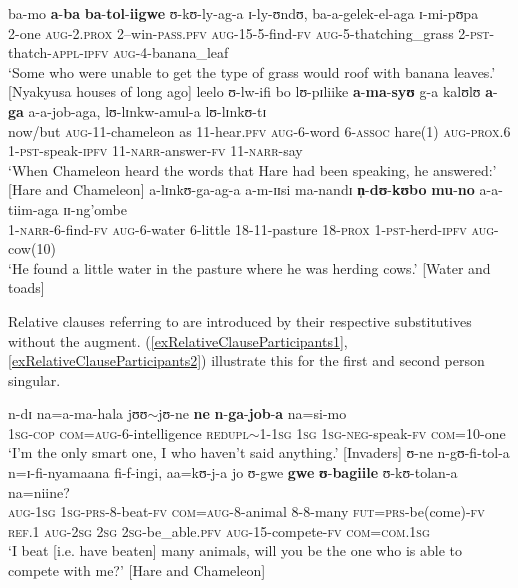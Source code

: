 \begin{exe}
	\ex \label{exSubjectRelativeClause} \gll ba-mo \textbf{a}-\textbf{ba} \textbf{ba}-\textbf{tol}-\textbf{iigwe} ʊ-kʊ-ly-ag-a ɪ-ly-ʊndʊ, ba-a-gelek-el-aga ɪ-mi-pʊpa \\
	2-one \textsc{aug}-2.\textsc{prox} 2--win-\textsc{pass.pfv} \textsc{aug}-15-5-find-\textsc{fv} \textsc{aug}-5-thatching\_grass 2-\textsc{pst}-thatch-\textsc{appl}-\textsc{ipfv} \textsc{aug}-4-banana\_leaf \\
	\glt `Some who were unable to get the type of grass would roof with banana leaves.' [Nyakyusa houses of long ago]
	\ex \label{exObjectRelativeClause}\gll leelo ʊ-lw-ifi bo lʊ-pɪliike \textbf{a}-\textbf{ma}-\textbf{syʊ} g-a kalʊlʊ \textbf{a}-\textbf{ga} a-a-job-aga, lʊ-lɪnkw-amul-a lʊ-lɪnkʊ-tɪ\\
	now/but \textsc{aug}-11-chameleon as 11-hear.\textsc{pfv} \textsc{aug}-6-word 6-\textsc{assoc} hare(1) \textsc{aug}-\textsc{prox.6} 1-\textsc{pst}-speak-\textsc{ipfv} 11-\textsc{narr}-answer-\textsc{fv} 11-\textsc{narr}-say\\
	\glt `When Chameleon heard the words that Hare had been speaking, he answered:' [Hare and Chameleon]
	\ex \label{exLocativeRelativeClause} \gll a-lɪnkʊ-ga-ag-a a-m-ɪɪsi ma-nandɪ \textbf{n̩}-\textbf{dʊ}-\textbf{kʊbo} \textbf{mu}-\textbf{no} a-a-tiim-aga ɪɪ-ng'ombe\\
	1-\textsc{narr}-6-find-\textsc{fv} \textsc{aug}-6-water 6-little 18-11-pasture 18-\textsc{prox} 1-\textsc{pst}-herd-\textsc{ipfv} \textsc{aug}-cow(10)\\
	\glt `He found a little water in the pasture where he was herding cows.' [Water and toads] 
\end{exe}

Relative clauses referring to  are introduced by their respective substitutives without the augment. (\ref{exRelativeClauseParticipants1}, \ref{exRelativeClauseParticipants2}) illustrate this for the first and second person singular.
\begin{exe}
	\ex \label{exRelativeClauseParticipants1}
	\gll n-dɪ na=a-ma-hala jʊʊ$\sim$jʊ-ne \textbf{ne} \textbf{n}-\textbf{ga}-\textbf{job}-\textbf{a} na=si-mo\\
	\textsc{1sg}-\textsc{cop} \textsc{com}=\textsc{aug}-6-intelligence \textsc{redupl}$\sim$1-\textsc{1sg} \textsc{1sg} \textsc{1sg}-\textsc{neg}-speak-\textsc{fv} \textsc{com}=10-one\\
	\glt \lq I'm the only smart one, I who haven't said anything.' [Invaders]
	\ex\label{exRelativeClauseParticipants2}\gll ʊ-ne n-gʊ-fi-tol-a n=ɪ-fi-nyamaana fi-f-ingi, aa=kʊ-j-a jo ʊ-gwe \textbf{gwe} \textbf{ʊ}-\textbf{bagiile} ʊ-kʊ-tolan-a na=niine?\\
	\textsc{aug}-\textsc{1sg} \textsc{1sg}-\textsc{prs}-8-beat-\textsc{fv} \textsc{com}=\textsc{aug}-8-animal 8-8-many \textsc{fut}=\textsc{prs}-be(come)-\textsc{fv} \textsc{ref.1} \textsc{aug}-\textsc{2sg} \textsc{2sg} \textsc{2sg}-be\_able.\textsc{pfv} \textsc{aug}-15-compete-\textsc{fv} \textsc{com}=\textsc{com.1sg}\\
	\glt `I beat [i.e. have beaten] many animals, will you be the one who is able to compete with me?' [Hare and Chameleon]
\end{exe}

